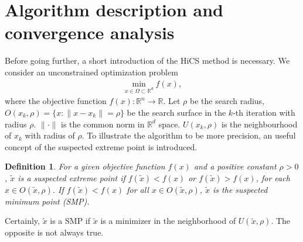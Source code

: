 \documentclass[final,1p,times]{elsarticle}
\newtheorem{definition}{Definition}
\newtheorem{proposition}{Proposition}
\def\bbR{\mathbb{R}}
\begin{document}
\section{Algorithm description and convergence analysis}
\label{sec:algorithm}

Before going further, a short introduction of the
HiCS method is necessary.
We consider an unconstrained optimization problem 
\begin{align}
	\min_{x\in\Omega\subset\mathbb{R}^d} f(x),
	\label{}
\end{align}
where the objective function $f(x):\bbR^n\rightarrow \bbR$.
Let $\rho$ be the search radius, $O(x_k, \rho)=\{x:
\|x-x_k \|=\rho\}$ be the search surface in the
$k$-th iteration with radius $\rho$. $\|\cdot \|$ is the common
norm in $\bbR^d$ space.  $U(x_k, \rho)$ is the neighbourhood of
$x_k$ with radius of $\rho$.  To illustrate the algorithm to be
more precision, an useful concept of the suspected extreme point is
introduced.
\begin{definition}	
	For a given objective function $f(x)$ and a positive constant 
	$\rho>0$, $\tilde{x}$ is a suspected extreme point if
	$f(\tilde x)<f(x)$ or $f(\tilde x)>f(x)$, for each $x \in O(\tilde{x},\rho)$.
	If $f(\tilde x) < f(x)$ for all $x\in O(\tilde{x},\rho)$,
	$\tilde{x}$ is the suspected minimum point (SMP).
\end{definition}
Certainly, $\tilde{x}$ is a SMP if $\tilde{x}$ is a minimizer in
the neighborhood of $U(\tilde{x}, \rho)$. The opposite is not always true.
\end{document}
